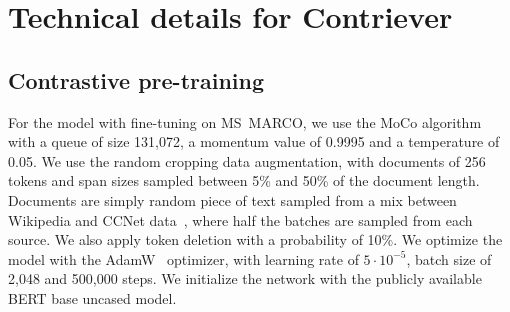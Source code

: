 \documentclass[10pt]{article} %
\def \ours          {Contriever}
\begin{document}





\section{Technical details for \ours}
\label{appendix:technical}
\subsection{Contrastive pre-training}
\label{appendix:technical_pretraining}
For the model with fine-tuning on MS~MARCO, we use the MoCo algorithm~\cite{he2020momentum} with a queue of size 131,072, a momentum value of 0.9995 and a temperature of 0.05.
We use the random cropping data augmentation, with documents of 256 tokens and span sizes sampled between 5\% and 50\% of the document length.
Documents are simply random piece of text sampled from a mix between Wikipedia and CCNet data~\citep{wenzek-etal-2020-ccnet}, where half the batches are sampled from each source.
We also apply token deletion with a probability of 10\%.
We optimize the model with the AdamW~\citep{loshchilov2019decoupled} optimizer, with learning rate of $5 \cdot 10^{-5}$, batch size of 2,048 and 500,000 steps.
We initialize the network with the publicly available BERT base uncased model.
\end{document}
